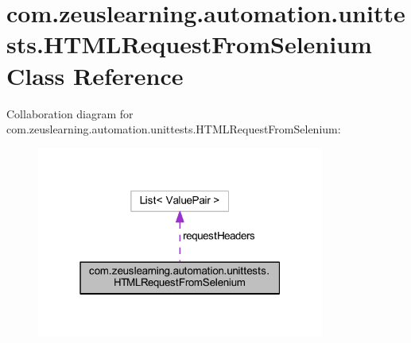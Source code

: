 \hypertarget{classcom_1_1zeuslearning_1_1automation_1_1unittests_1_1HTMLRequestFromSelenium}{}\section{com.\+zeuslearning.\+automation.\+unittests.\+H\+T\+M\+L\+Request\+From\+Selenium Class Reference}
\label{classcom_1_1zeuslearning_1_1automation_1_1unittests_1_1HTMLRequestFromSelenium}


Collaboration diagram for com.\+zeuslearning.\+automation.\+unittests.\+H\+T\+M\+L\+Request\+From\+Selenium\+:
\nopagebreak
\begin{figure}[H]
\begin{center}
\leavevmode
\includegraphics[width=268pt]{d7/d07/classcom_1_1zeuslearning_1_1automation_1_1unittests_1_1HTMLRequestFromSelenium__coll__graph}
\end{center}
\end{figure}
